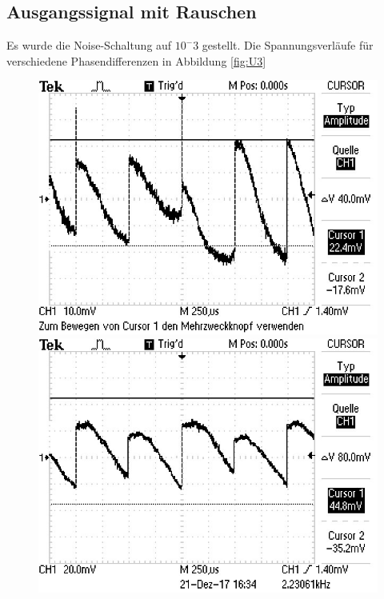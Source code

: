 \subsection{Ausgangssignal mit Rauschen}
\label{sec:mR}
Es wurde die Noise-Schaltung auf $10^-3$ gestellt. Die Spannungsverläufe für verschiedene Phasendifferenzen in Abbildung \ref{fig:U3}
\begin{figure}
\centering
\begin{minipage}{0.48\textwidth}
\centering
{}
\includegraphics[scale=0.75]{content/images/noise0.jpg}
\end{minipage}
\begin{minipage}{0.48\textwidth}
\centering
{}
\includegraphics[scale=0.75]{content/images/noise45.jpg}
\end{minipage}


\end{figure}
